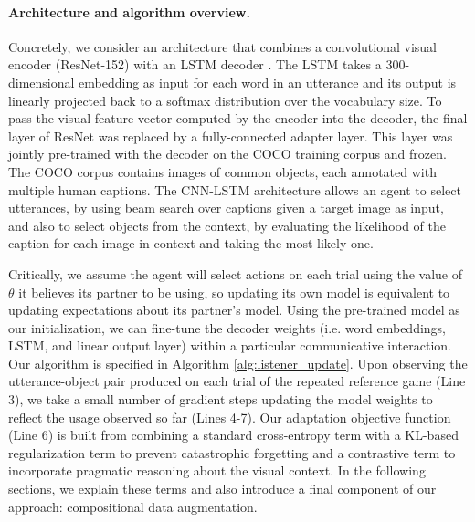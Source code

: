 \documentclass[11pt,a4paper]{article}
\newcommand{\algref}[1]{Algorithm \ref{#1}} %
\begin{document}
\paragraph{Architecture and algorithm overview.}
Concretely, we consider an architecture that combines a convolutional visual encoder (ResNet-152) with an LSTM decoder \cite{vinyals_show_2015}.
The LSTM takes a 300-dimensional embedding as input for each word in an utterance and its output is linearly projected back to a softmax distribution over the vocabulary size.
To pass the visual feature vector computed by the encoder into the decoder, the final layer of ResNet was replaced by a fully-connected adapter layer.
This layer was jointly pre-trained with the decoder on the COCO training corpus  \cite{lin2014microsoft} and frozen. 
The COCO corpus contains images of common objects, each annotated with multiple human captions. 
The CNN-LSTM architecture allows an agent to select utterances, by using beam search over captions given a target image as input, and also to select objects from the context, by evaluating the likelihood of the caption for each image in context and taking the most likely one. 

Critically, we assume the agent will select actions on each trial using the value of $\theta$ it believes its partner to be using, so updating its own model is equivalent to updating expectations about its partner's model.
Using the pre-trained model as our initialization, we can fine-tune the decoder weights (i.e. word embeddings, LSTM, and linear output layer) within a particular communicative interaction.
Our algorithm is specified in \algref{alg:listener_update}.
Upon observing the utterance-object pair produced on each trial of the repeated reference game (Line 3), we take a small number of gradient steps updating the model weights to reflect the usage observed so far (Lines 4-7).
Our adaptation objective function (Line 6) is built from combining a standard cross-entropy term with a KL-based regularization term to prevent catastrophic forgetting and a contrastive term to incorporate pragmatic reasoning about the visual context. 
In the following sections, we explain these terms and also introduce a final component of our approach: compositional data augmentation. 
\end{document}
